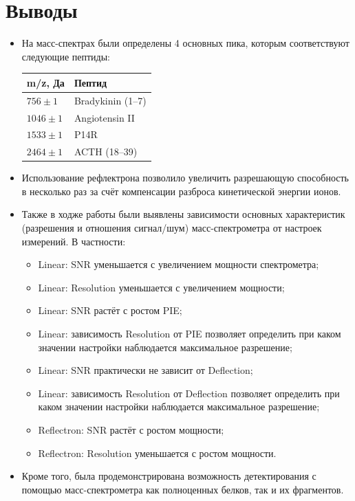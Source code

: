 \documentclass{article}
\begin{document}
\section{Выводы}
\begin{itemize}
    \item На масс-спектрах были определены 4 основных пика, которым соответствуют следующие пептиды:
    \begin{table}[h!]
    \centering
    \begin{tabular}{|l|l|}
    \hline
    m/z, Да & Пептид           \\ \hline
    $756\pm1$     & Bradykinin (1–7) \\ \hline
    $1046\pm1$    & Angiotensin II   \\ \hline
    $1533\pm1$    & P14R             \\ \hline
    $2464\pm1$    & ACTH (18–39)     \\ \hline
    \end{tabular}
    \end{table}
    \item Использование рефлектрона позволило увеличить разрешающую способность в несколько раз за счёт компенсации разброса кинетической энергии ионов.
    \item Также в ходже работы были выявлены зависимости основных характеристик (разрешения и отношения сигнал/шум) масс-спектрометра от настроек измерений. В частности:
    \begin{itemize}
        \item Linear: SNR уменьшается с увеличением мощности спектрометра;
        \item Linear: Resolution уменьшается с увеличением мощности;
        \item Linear: SNR растёт с ростом PIE;
        \item Linear: зависимость Resolution от PIE позволяет определить при каком значении настройки наблюдается максимальное разрешение;
        \item Linear: SNR практически не зависит от Deflection;
        \item Linear: зависимость Resolution от Deflection позволяет определить при каком значении настройки наблюдается максимальное разрешение;
        \item Reflectron: SNR растёт с ростом мощности;
        \item Reflectron: Resolution уменьшается с ростом мощности.
    \end{itemize}
    \item Кроме того, была продемонстрирована возможность детектирования с помощью масс-спектрометра как полноценных белков, так и их фрагментов.
\end{itemize}
\end{document}
